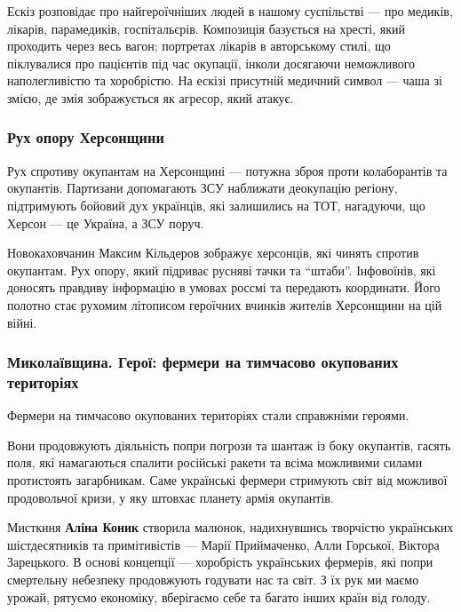 Ескіз розповідає про найгероїчніших людей в нашому суспільстві — про медиків,
лікарів, парамедиків, госпітальєрів. Композиція базується на хресті, який
проходить через весь вагон; портретах лікарів в авторському стилі, що
піклувалися про пацієнтів під час окупації, інколи досягаючи неможливого
наполегливістю та хоробрістю. На ескізі присутній медичний символ — чаша зі
змією, де змія зображується як агресор, який атакує. 

\subsubsection{Рух опору Херсонщини}

Рух спротиву окупантам на Херсонщині — потужна зброя проти колаборантів та
окупантів. Партизани допомагають ЗСУ наближати деокупацію регіону, підтримують
бойовий дух українців, які залишились на ТОТ, нагадуючи, що Херсон — це
Україна, а ЗСУ поруч.


Новокаховчанин Максим Кільдеров зображує херсонців, які чинять спротив
окупантам. Рух опору, який підриває русняві тачки та \enquote{штаби}. Інфовоїнів, які
доносять правдиву інформацію в умовах россмі та передають координати. Його
полотно стає рухомим літописом героїчних вчинків жителів Херсонщини на цій
війні. 

\subsubsection{Миколаївщина. Герої: фермери на тимчасово окупованих територіях}

Фермери на тимчасово окупованих територіях стали справжніми героями.

Вони продовжують діяльність попри погрози та шантаж із боку окупантів, гасять
поля, які намагаються спалити російські ракети та всіма можливими силами
протистоять загарбникам. Саме українські фермери стримують світ від можливої
продовольчої кризи, у яку штовхає планету армія окупантів.


Мисткиня \textbf{Аліна Коник} створила малюнок, надихнувшись творчістю українських
шістдесятників та примітивістів — Марії Приймаченко, Алли Горської, Віктора
Зарецького. В основі концепції — хоробрість українських фермерів, які попри
смертельну небезпеку продовжують годувати нас та світ. З їх рук ми маємо
урожай, рятуємо економіку, вберігаємо себе та багато інших країн від голоду.

